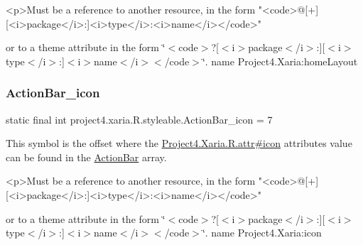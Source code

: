 \begin{DoxyVerb}      <p>Must be a reference to another resource, in the form "<code>@[+][<i>package</i>:]<i>type</i>:<i>name</i></code>"
\end{DoxyVerb}
 or to a theme attribute in the form \char`\"{}$<$code$>$?\mbox{[}$<$i$>$package$<$/i$>$\+:\mbox{]}\mbox{[}$<$i$>$type$<$/i$>$\+:\mbox{]}$<$i$>$name$<$/i$>$$<$/code$>$\char`\"{}.  name Project4.\+Xaria\+:home\+Layout \mbox{\label{classproject4_1_1xaria_1_1R_1_1styleable_ac5aaeb633d4d1312de58e956afac37b1}} 
\subsubsection{\texorpdfstring{Action\+Bar\+\_\+icon}{ActionBar\_icon}}
{\footnotesize\ttfamily static final int project4.\+xaria.\+R.\+styleable.\+Action\+Bar\+\_\+icon = 7\hspace{0.3cm}{\ttfamily [static]}}

This symbol is the offset where the \hyperlink{}{Project4.\+Xaria.\+R.\+attr\#icon} attribute\textquotesingle{}s value can be found in the \hyperlink{classproject4_1_1xaria_1_1R_1_1styleable_accb530194c58ee3abb15587da8869e99}{Action\+Bar} array.

\begin{DoxyVerb}      <p>Must be a reference to another resource, in the form "<code>@[+][<i>package</i>:]<i>type</i>:<i>name</i></code>"
\end{DoxyVerb}
 or to a theme attribute in the form \char`\"{}$<$code$>$?\mbox{[}$<$i$>$package$<$/i$>$\+:\mbox{]}\mbox{[}$<$i$>$type$<$/i$>$\+:\mbox{]}$<$i$>$name$<$/i$>$$<$/code$>$\char`\"{}.  name Project4.\+Xaria\+:icon \mbox{\label{classproject4_1_1xaria_1_1R_1_1styleable_a7b820690f429621509300f757ddbd3da}} 
